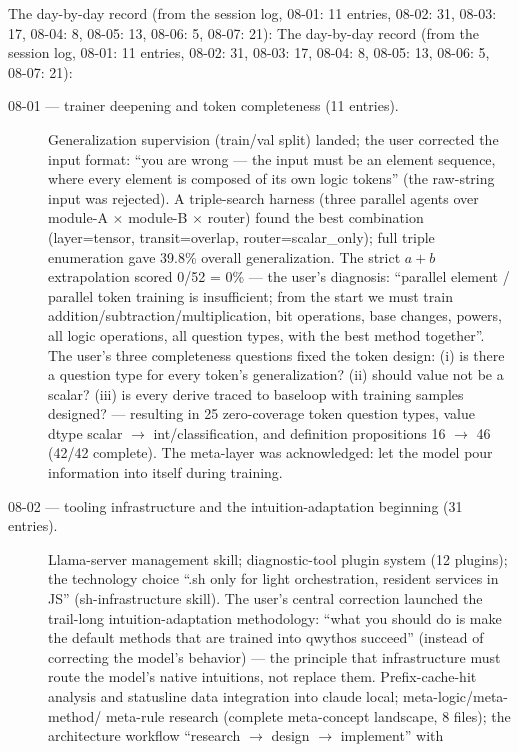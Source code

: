 \documentclass[sigplan,10pt,anonymous,review]{acmart}
\begin{document}
The day-by-day record (from the session log, 08-01: 11 entries, 08-02: 31,
08-03: 17, 08-04: 8, 08-05: 13, 08-06: 5, 08-07: 21): The
day-by-day record (from the session log, 08-01: 11 entries, 08-02: 31,
08-03: 17, 08-04: 8, 08-05: 13, 08-06: 5, 08-07: 21):

\begin{description}
\item[08-01 --- trainer deepening and token completeness (11 entries).]
Generalization supervision (train/val split) landed; the user corrected
the input format: ``you are wrong --- the input must be an element
sequence, where every element is composed of its own logic tokens'' (the
raw-string input was rejected). A triple-search harness (three parallel
agents over module-A $\times$ module-B $\times$ router) found the best
combination (layer=tensor, transit=overlap, router=scalar\_only); full
triple enumeration gave 39.8\% overall generalization. The strict $a+b$
extrapolation scored 0/52 = 0\% --- the user's diagnosis: ``parallel
element / parallel token training is insufficient; from the start we must
train addition/subtraction/multiplication, bit operations, base changes,
powers, all logic operations, all question types, with the best method
together''. The user's three completeness questions fixed the token
design: (i) is there a question type for every token's generalization? (ii)
should value not be a scalar? (iii) is every derive traced to baseloop
with training samples designed? --- resulting in 25 zero-coverage token
question types, value dtype scalar $\to$ int/classification, and
definition propositions 16 $\to$ 46 (42/42 complete). The meta-layer was
acknowledged: let the model pour information into itself during training.
\item[08-02 --- tooling infrastructure and the intuition-adaptation
beginning (31 entries).] Llama-server management skill; diagnostic-tool
plugin system (12 plugins); the technology choice ``.sh only for light
orchestration, resident services in JS'' (sh-infrastructure skill). The
user's central correction launched the trail-long intuition-adaptation
methodology: ``what you should do is make the default methods that are
trained into qwythos succeed'' (instead of correcting the model's
behavior) --- the principle that infrastructure must route the model's
native intuitions, not replace them. Prefix-cache-hit analysis and
statusline data integration into claude local; meta-logic/meta-method/
meta-rule research (complete meta-concept landscape, 8 files); the
architecture workflow ``research $\to$ design $\to$ implement'' with

\end{description}
\end{document}
